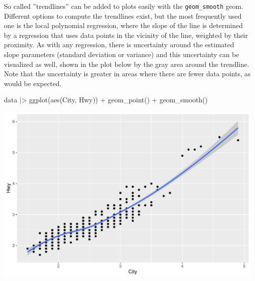 So called ''trendlines''  can be added to plots easily with the \texttt{geom\_smooth} geom. Different options to compute the trendlines exist, but the most frequently used one is the local polynomial regression, where the slope of the line is determined by a regression that uses data points in the vicinity of the line, weighted by their proximity. As with any regression, there is uncertainty around the estimated slope parameters (standard deviation or variance) and this uncertainty can be visualized as well, shown in the plot below by the gray area around the trendline. Note that the uncertainty is greater in areas where there are fewer data points, as would be expected.

\begin{Rcode}
data |>
  ggplot(aes(City, Hwy)) +
    geom_point() +
    geom_smooth()
\end{Rcode}

\begin{center}
  \includegraphics[width=.8\textwidth]{fuel.linesSmooth.pdf}
\end{center}



